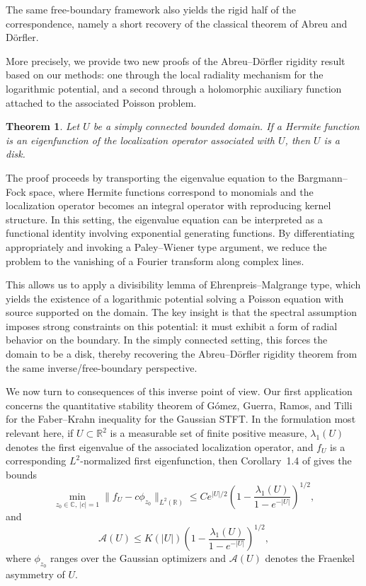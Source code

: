 \documentclass[a4paper,11pt,reqno]{amsart}
\numberwithin{equation}{section}
\theoremstyle{plain} %
\newtheorem{theorem}{Theorem}
\theoremstyle{definition} %
\theoremstyle{remark}
\newcommand{\R}{\mathbb{R}}
\newcommand{\C}{\mathbb{C}}
\begin{document}
\medskip

The same free-boundary framework also yields the rigid half of the correspondence, namely a short recovery of the classical theorem of Abreu and Dörfler.

More precisely, we provide two new proofs of the Abreu--Dörfler rigidity result based on our
methods: one through the local radiality mechanism for the logarithmic potential, and a second
through a holomorphic auxiliary function attached to the associated Poisson problem.

\begin{theorem}\label{thm:eig-loc-U}
Let $U$ be a simply connected bounded domain. If a Hermite function is an eigenfunction of the localization operator associated with $U$, then $U$ is a disk.
\end{theorem}

The proof proceeds by transporting the eigenvalue equation to the Bargmann--Fock space, where Hermite functions correspond to monomials and the localization operator becomes an integral operator with reproducing kernel structure. In this setting, the eigenvalue equation can be interpreted as a functional identity involving exponential generating functions. By differentiating appropriately and invoking a Paley--Wiener type argument, we reduce the problem to the vanishing of a Fourier transform along complex lines.

This allows us to apply a divisibility lemma of Ehrenpreis--Malgrange type, which yields the existence of a logarithmic potential solving a Poisson equation with source supported on the domain. The key insight is that the spectral assumption imposes strong constraints on this potential: it must exhibit a form of radial behavior on the boundary. In the simply connected setting, this forces the domain to be a disk, thereby recovering the Abreu--Dörfler rigidity theorem from the same inverse/free-boundary perspective.

\medskip

We now turn to consequences of this inverse point of view. Our first application concerns the quantitative stability theorem of G\'omez, Guerra, Ramos, and Tilli for the Faber--Krahn inequality for the Gaussian STFT. In the formulation most relevant here, if \(U\subset \R^2\) is a measurable set of finite positive measure, \(\lambda_1(U)\) denotes the first eigenvalue of the associated localization operator, and \(f_U\) is a corresponding \(L^2\)-normalized first eigenfunction, then Corollary~1.4 of \cite{Gomez-Guerra-Ramos-Tilli} gives the bounds
\[
\min_{z_0\in\C,\ |c|=1}\|f_U-c\phi_{z_0}\|_{L^2(\R)}
\leq
C e^{|U|/2}
\left(
1-\frac{\lambda_1(U)}{1-e^{-|U|}}
\right)^{1/2},
\]
and
\[
\mathcal A(U)
\leq
K(|U|)
\left(
1-\frac{\lambda_1(U)}{1-e^{-|U|}}
\right)^{1/2},
\]
where \(\phi_{z_0}\) ranges over the Gaussian optimizers and \(\mathcal A(U)\) denotes the Fraenkel asymmetry of \(U\).
\end{document}
